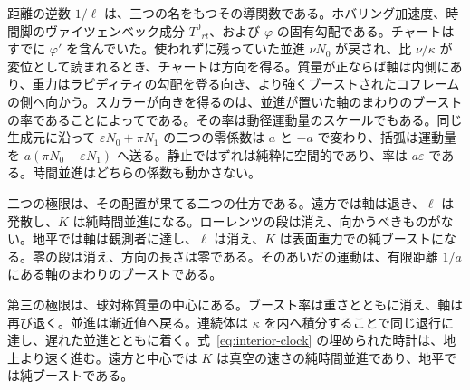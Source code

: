 \documentclass[a4paper]{article}
\begin{document}
距離の逆数 \(1/\ell\) は、三つの名をもつその導関数である。ホバリング加速度、時間脚のヴァイツェンベック成分 \(T^{0}{}_{rt}\)、および \(\varphi\) の固有勾配である。チャートはすでに \(\varphi'\) を含んでいた。使われずに残っていた並進 \(\nu N_{0}\) が戻され、比 \(\nu/\kappa\) が変位として読まれるとき、チャートは方向を得る。質量が正ならば軸は内側にあり、重力はラピディティの勾配を登る向き、より強くブーストされたコフレームの側へ向かう。スカラーが向きを得るのは、並進が置いた軸のまわりのブーストの率であることによってである。その率は動径運動量のスケールでもある。同じ生成元に沿って \(\varepsilon N_{0}+\pi N_{1}\) の二つの零係数は \(a\) と \(-a\) で変わり、括弧は運動量を \(a(\pi N_{0}+\varepsilon N_{1})\) へ送る。静止ではずれは純粋に空間的であり、率は \(a\varepsilon\) である。時間並進はどちらの係数も動かさない。

二つの極限は、その配置が果てる二つの仕方である。遠方では軸は退き、\(\ell\) は発散し、\(K\) は純時間並進になる。ローレンツの段は消え、向かうべきものがない。地平では軸は観測者に達し、\(\ell\) は消え、\(K\) は表面重力での純ブーストになる。零の段は消え、方向の長さは零である。そのあいだの運動は、有限距離 \(1/a\) にある軸のまわりのブーストである。

第三の極限は、球対称質量の中心にある。ブースト率は重さとともに消え、軸は再び退く。並進は漸近値へ戻る。連続体は \(\kappa\) を内へ積分することで同じ退行に達し、遅れた並進とともに着く。式~\eqref{eq:interior-clock} の埋められた時計は、地上より速く進む。遠方と中心では \(K\) は真空の速さの純時間並進であり、地平では純ブーストである。
\end{document}
